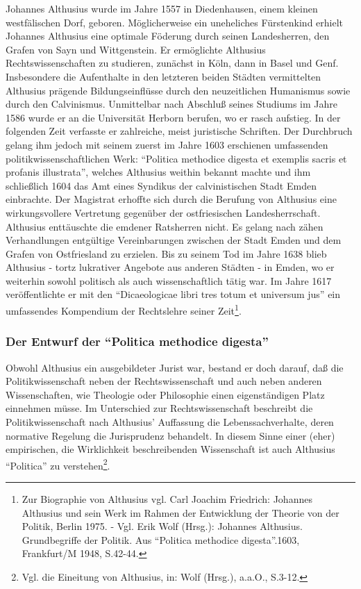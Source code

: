 \documentclass[a4paper,12pt]{article}
\begin{document}
Johannes Althusius wurde im Jahre 1557 in Diedenhausen, einem
kleinen westfälischen Dorf, geboren. Möglicherweise ein
uneheliches Fürstenkind erhielt Johannes Althusius eine optimale
Föderung durch seinen Landesherren, den Grafen von Sayn und
Wittgenstein. Er ermöglichte Althusius Rechtswissenschaften zu
studieren, zunächst in Köln, dann in Basel und Genf. Insbesondere
die Aufenthalte in den letzteren beiden Städten vermittelten
Althusius prägende Bildungseinflüsse durch den neuzeitlichen
Humanismus sowie durch den Calvinismus. Unmittelbar nach Abschluß
seines Studiums im Jahre 1586 wurde er an die Universität Herborn
berufen, wo er rasch aufstieg. In der folgenden Zeit verfasste er
zahlreiche, meist juristische Schriften. Der Durchbruch gelang ihm
jedoch mit seinem zuerst im Jahre 1603 erschienen umfassenden
politikwissenschaftlichen Werk: "`Politica methodice digesta et
exemplis sacris et profanis illustrata"', welches Althusius weithin
bekannt machte und ihm schließlich 1604 das Amt eines Syndikus der
calvinistischen Stadt Emden einbrachte. Der Magistrat erhoffte sich
durch die Berufung von Althusius eine wirkungsvollere Vertretung
gegenüber der ostfriesischen Landesherrschaft. Althusius
enttäuschte die emdener Ratsherren nicht. Es gelang nach zähen
Verhandlungen entgültige Vereinbarungen zwischen der Stadt Emden
und dem Grafen von Ostfriesland zu erzielen. Bis zu seinem Tod im
Jahre 1638 blieb Althusius - tortz lukrativer Angebote aus anderen
Städten - in Emden, wo er weiterhin sowohl politisch als auch
wissenschaftlich tätig war. Im Jahre 1617 veröffentlichte er mit
den "`Dicaeologicae libri tres totum et universum jus"' ein
umfassendes Kompendium der Rechtslehre seiner Zeit\footnote{Zur
Biographie von Althusius vgl. Carl Joachim
Friedrich\cite{friedrich1}: Johannes Althusius und sein Werk im
Rahmen der Entwicklung der Theorie von der Politik, Berlin 1975. -
Vgl. Erik Wolf (Hrsg.)\cite{wolf}: Johannes
Althusius. Grundbegriffe der Politik. Aus "`Politica methodice
digesta"'.1603, Frankfurt/M 1948, S.42-44.}.

\subsubsection{Der Entwurf der "`Politica methodice digesta"'}

Obwohl Althusius ein ausgebildeter Jurist war, bestand er doch
darauf, daß die Politikwissenschaft neben der Rechtswissenschaft
und auch neben anderen Wissenschaften, wie Theologie oder
Philosophie einen eigenständigen Platz einnehmen müsse. Im
Unterschied zur Rechtswissenschaft beschreibt die
Politikwissenschaft nach Althusius' Auffassung die
Lebenssachverhalte, deren normative Regelung die Jurisprudenz
behandelt. In diesem Sinne einer (eher) empirischen, die
Wirklichkeit beschreibenden Wissenschaft ist auch Althusius
"`Politica"' zu verstehen\footnote{Vgl. die Eineitung von
Althusius, in: Wolf (Hrsg.)\cite{wolf}, a.a.O., S.3-12.}.
\end{document}
